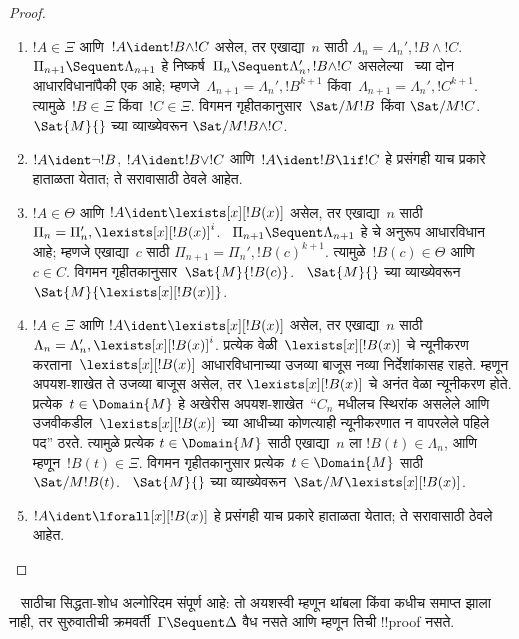 \documentclass[../../../include/open-logic-section]{subfiles}
\begin{document}
\begin{proof}
\begin{enumerate}
  \item $!A \in \Xi$ आणि~$!A \ident !B \land !C$
  असेल, तर एखाद्या~$n$ साठी
  $\Lambda_n = \Lambda_n', !B \land !C$.
  ~$\Pi_{n+1} \Sequent \Lambda_{n+1}$ हे
  निष्कर्ष~$\Pi_n \Sequent \Lambda'_n, !B \land !C$
  असलेल्या~\RightR{\land} च्या दोन आधारविधानांपैकी
  एक आहे; म्हणजे~$\Lambda_{n+1} = \Lambda_n', !B^{k+1}$
  किंवा~$\Lambda_{n+1} = \Lambda_n', !C^{k+1}$.
  त्यामुळे~$!B \in \Xi$ किंवा~$!C \in \Xi$.
  विगमन गृहीतकानुसार~$\Sat/{M}{!B}$ किंवा
  $\Sat/{M}{!C}$. ~$\Sat{M}{}$ च्या व्याख्येवरून
  $\Sat/{M}{!B \land !C}$.

  \item $!A \ident \lnot !B$,
  $!A \ident !B \lor !C$ आणि~$!A \ident !B \lif !C$
  हे प्रसंगही याच प्रकारे हाताळता येतात;
  ते सरावासाठी ठेवले आहेत.

  \item $!A \in \Theta$ आणि
  $!A \ident \lexists[x][!B(x)]$ असेल,
  तर एखाद्या~$n$ साठी
  $\Pi_n = \Pi_n', \lexists[x][!B(x)]^i$.
  ~$\Pi_{n+1} \Sequent \Lambda_{n+1}$ हे
  \LeftR{\lexists} चे अनुरूप आधारविधान आहे;
  म्हणजे एखाद्या~$c$ साठी
  $\Pi_{n+1} = \Pi_n', !B(c)^{k+1}$.
  त्यामुळे~$!B(c) \in \Theta$ आणि~$c \in C$.
  विगमन गृहीतकानुसार~$\Sat{M}{!B(c)}$.
  ~$\Sat{M}{}$ च्या व्याख्येवरून
  $\Sat{M}{\lexists[x][!B(x)]}$.

  \item $!A \in \Xi$ आणि
  $!A \ident \lexists[x][!B(x)]$ असेल,
  तर एखाद्या~$n$ साठी
  $\Lambda_n = \Lambda_n', \lexists[x][!B(x)]^i$.
  प्रत्येक वेळी~$\lexists[x][!B(x)]$ चे
  न्यूनीकरण करताना~$\lexists[x][!B(x)]$
  आधारविधानाच्या उजव्या
  बाजूस नव्या निर्देशांकासह राहते. म्हणून
  अपयश-शाखेत ते उजव्या बाजूस असेल, तर
  $\lexists[x][!B(x)]$ चे अनंत वेळा
  न्यूनीकरण होते. प्रत्येक~$t \in \Domain{M}$
  हे अखेरीस अपयश-शाखेत~``$C_n$ मधीलच स्थिरांक
  असलेले आणि उजवीकडील~$\lexists[x][!B(x)]$
  च्या आधीच्या कोणत्याही न्यूनीकरणात न वापरलेले
  पहिले पद'' ठरते. त्यामुळे प्रत्येक
  $t \in \Domain{M}$ साठी एखाद्या~$n$ ला
  $!B(t) \in \Lambda_n$, आणि म्हणून~$!B(t) \in \Xi$.
  विगमन गृहीतकानुसार प्रत्येक~$t \in \Domain{M}$
  साठी~$\Sat/{M}{!B(t)}$. ~$\Sat{M}{}$
  च्या व्याख्येवरून~$\Sat/{M}{\lexists[x][!B(x)]}$.

  \item $!A \ident \lforall[x][!B(x)]$
  हे प्रसंगही याच प्रकारे हाताळता येतात;
  ते सरावासाठी ठेवले आहेत.
\end{enumerate}
\end{proof}

\begin{cor}
~ साठीचा सिद्धता-शोध अल्गोरिदम संपूर्ण
आहे: तो अयशस्वी म्हणून थांबला किंवा कधीच समाप्त झाला नाही,
तर सुरुवातीची क्रमवर्ती~$\Gamma \Sequent \Delta$
वैध नसते आणि म्हणून तिची !!{proof} नसते.
\end{cor}
\end{document}
